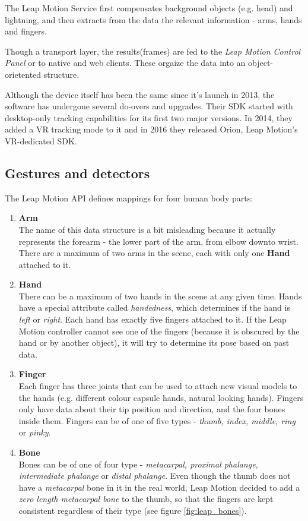 \documentclass[12pt,a4paper,twoside]{report}
\begin{document}
The Leap Motion Service first compensates background objects (e.g. head) and lightning, and then extracts from the data the relevant information - arms, hands and fingers.

Though a transport layer, the results(frames) are fed to the \textit{Leap Motion Control Panel} or to native and web clients. These orgaize the data into an object-orietented structure.

Although the device itself has been the same since it's launch in 2013, the software has undergone several do-overs and upgrades. Their SDK started with desktop-only tracking capabilities for its first two major versions. In 2014, they added a VR tracking mode to it and in 2016 they released Orion, Leap Motion's VR-dedicated SDK.

\subsection{Gestures and detectors}

The Leap Motion API \cite{LMAPI} defines mappings for four human body parts:\cite{LMAPI}

\begin{enumerate}
  \item \textbf{Arm} \\
    The name of this data structure is a bit misleading because it actually represents the forearm - the lower part of the arm, from elbow downto wrist. There are a maximum of two arms in the scene, each with only one \textbf{Hand} attached to it.
  \item \textbf{Hand} \\
    There can be a maximum of two hands in the scene at any given time. Hands have a special attribute called \textit{handedness}, which determines if the hand is \textit{left} or \textit{right}. Each hand has exactly five fingers attached to it. If the Leap Motion controller cannot see one of the fingers (because it is obscured by the hand or by another object), it will try to determine its pose based on past data.
  \item \textbf{Finger} \\
    Each finger has three joints that can be used to attach new visual models to the hands (e.g. different colour capsule hands, natural looking hands). Fingers only have data about their tip position and direction, and the four bones inside them. Fingers can be of one of five types - \textit{thumb, index, middle, ring} or \textit{pinky}.
  \item \textbf{Bone} \\
    Bones can be of one of four type - \textit{metacarpal, proximal phalange, intermediate phalange} or \textit{distal phalange}. Even though the thumb does not have a \textit{metacarpal} bone in it in the real world, Leap Motion decided to add a \textit{zero length metacarpal bone} to the thumb, so that the fingers are kept consistent regardless of their type (see figure \ref{fig:leap_bones}).
\end{enumerate}
\end{document}
